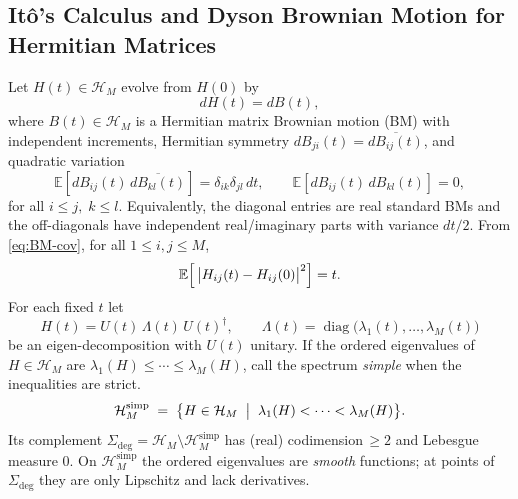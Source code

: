 \documentclass[12pt,reqno]{amsart}
\theoremstyle{plain}
\theoremstyle{definition}
\theoremstyle{remark}
\begin{document}
\subsection{Itô’s Calculus and Dyson Brownian Motion for Hermitian Matrices}
Let $H(t)\in\mathcal H_M$ evolve from $H(0)$ by
\begin{equation}\label{eq:DBM-matrix}
  dH(t)=dB(t),
\end{equation}
where $B(t)\in\mathcal H_M$ is a Hermitian matrix Brownian motion (BM) with independent
increments, Hermitian symmetry $dB_{ji}(t)=\overline{dB_{ij}(t)}$, and quadratic
variation
\begin{equation}\label{eq:BM-cov}
  \mathbb E\!\left[dB_{ij}(t)\,\overline{dB_{kl}(t)}\right]
  = \delta_{ik}\delta_{jl}\,dt,
  \qquad
  \mathbb E\!\left[dB_{ij}(t)\,dB_{kl}(t)\right]=0,
\end{equation}
for all $i\le j,\;k\le l$. Equivalently, the diagonal entries are real standard BMs and the off-diagonals have
independent real/imaginary parts with variance $dt/2$. From \eqref{eq:BM-cov},
for all $1\le i,j\le M$,
\begin{equation}\label{eq:entry-variance}
  \mathbb E\Bigl[\,\bigl|H_{ij}(t)-H_{ij}(0)\bigr|^{2}\Bigr]=t.
\end{equation}
 For each fixed $t$ let
\begin{equation} 
H(t)=U(t)\,\Lambda(t)\,U(t)^\dagger,
\qquad
\Lambda(t)=\operatorname{diag} \!\bigl(\lambda_1(t),\dots,\lambda_M (t)\bigr)
\end{equation} 
be an eigen-decomposition with $U(t)$ unitary. If the ordered eigenvalues of \(H\in\mathcal H_M\) are
\(\lambda_1(H)\le\cdots\le\lambda_M(H)\), call the spectrum
\emph{simple} when the inequalities are strict.
\begin{equation}
\mathcal H_M^{\mathrm{simp}}
 \;=\;
 \bigl\{H\in\mathcal H_M
        \;\bigm|\;
        \lambda_1(H)<\cdots<\lambda_M(H)\bigr\}.
\end{equation}
Its complement
\(\Sigma_{\mathrm{deg}}=\mathcal H_M\setminus\mathcal H_M^{\mathrm{simp}}\)
has (real) codimension\,\(\ge 2\) and Lebesgue measure \(0\).
On \(\mathcal H_M^{\mathrm{simp}}\) the ordered eigenvalues are
\emph{smooth} functions; at points of \(\Sigma_{\mathrm{deg}}\) they are
only Lipschitz and lack derivatives.
\end{document}

